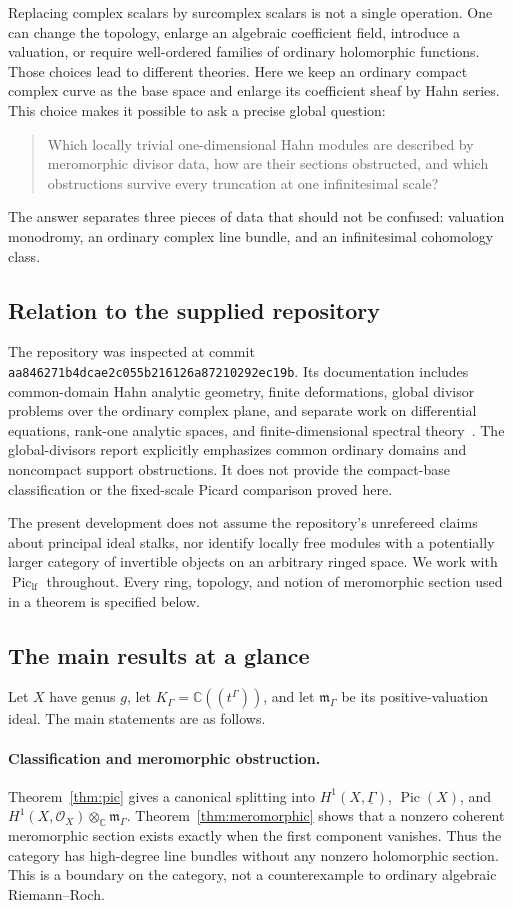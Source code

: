 \documentclass[11pt,letterpaper]{article}
\numberwithin{equation}{section}
\theoremstyle{definition}
\theoremstyle{remark}
\newcommand{\C}{\mathbb C}
\newcommand{\OO}{\mathcal O}
\newcommand{\mm}{\mathfrak m}
\newcommand{\Pic}{\operatorname{Pic}}
\newcommand{\Piclf}{\operatorname{Pic}_{\mathrm{lf}}}
\newcommand{\Kg}{K_\Gamma}
\newcommand{\mg}{\mm_\Gamma}
\newcommand{\ot}{\otimes_{\C}}
\begin{document}
Replacing complex scalars by surcomplex scalars is not a single operation.
One can change the topology, enlarge an algebraic coefficient field,
introduce a valuation, or require well-ordered families of ordinary
holomorphic functions. Those choices lead to different theories. Here we
keep an ordinary compact complex curve as the base space and enlarge its
coefficient sheaf by Hahn series. This choice makes it possible to ask a
precise global question:
\begin{quote}
Which locally trivial one-dimensional Hahn modules are described by
meromorphic divisor data, how are their sections obstructed, and which
obstructions survive every truncation at one infinitesimal scale?
\end{quote}
The answer separates three pieces of data that should not be confused:
valuation monodromy, an ordinary complex line bundle, and an infinitesimal
cohomology class.

\subsection{Relation to the supplied repository}
The repository was inspected at commit
\texttt{aa846271b4dcae2c055b216126a87210292ec19b}.
Its documentation includes common-domain Hahn analytic geometry,
finite deformations, global divisor problems over the ordinary complex
plane, and separate work on differential equations, rank-one analytic
spaces, and finite-dimensional spectral theory~\cite{repo}.
The global-divisors report explicitly emphasizes common ordinary domains
and noncompact support obstructions. It does not provide the compact-base
classification or the fixed-scale Picard comparison proved here.

The present development does not assume the repository's unrefereed
claims about principal ideal stalks, nor identify locally free modules
with a potentially larger category of invertible objects on an arbitrary
ringed space. We work with $\Piclf$ throughout. Every ring, topology, and
notion of meromorphic section used in a theorem is specified below.

\subsection{The main results at a glance}
Let $X$ have genus $g$, let $\Kg=\C((t^\Gamma))$, and let
$\mg$ be its positive-valuation ideal. The main statements are as follows.

\paragraph{Classification and meromorphic obstruction.}
Theorem~\ref{thm:pic} gives a canonical splitting into
$H^1(X,\underline\Gamma)$, $\Pic(X)$, and
$H^1(X,\OO_X)\ot\mg$. Theorem~\ref{thm:meromorphic} shows that a
nonzero coherent meromorphic section exists exactly when the first
component vanishes. Thus the category has high-degree line bundles
without any nonzero holomorphic section. This is a boundary on the
category, not a counterexample to ordinary algebraic Riemann--Roch.
\end{document}
